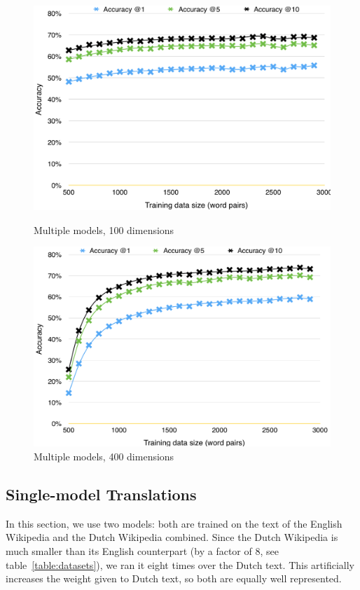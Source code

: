 \begin{figure}[!htb]
    \begin{minipage}{\textwidth}
      \centering
      \begin{minipage}{.45\textwidth}
          \includegraphics[width=\linewidth]{images/multiple_model_100_dim}
          \caption{Multiple models, 100 dimensions}
          \label{fig:mm_100}
      \end{minipage}
      \begin{minipage}{.45\textwidth}
          \includegraphics[width=\linewidth]{images/multiple_model_400_dim}
          \caption{Multiple models, 400 dimensions}
          \label{fig:mm_400}
      \end{minipage}
    \end{minipage}
\end{figure}

\subsection{Single-model Translations}
In this section, we use two models: both are trained on the text of the English Wikipedia and the Dutch Wikipedia combined. Since the Dutch Wikipedia is much smaller than its English counterpart (by a factor of 8, see table~\ref{table:datasets}), we ran it eight times over the Dutch text. This artificially increases the weight given to Dutch text, so both are equally well represented.

